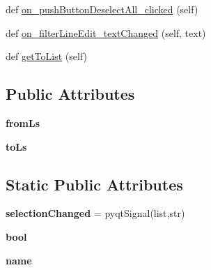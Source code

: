 \begin{DoxyCompactItemize}
\item 
def \mbox{\hyperlink{class_dsg_tools_1_1_custom_widgets_1_1custom_selector_1_1_custom_selector_accf01df90f08ef45db4669da7d15c205}{on\+\_\+push\+Button\+Deselect\+All\+\_\+clicked}} (self)
\item 
def \mbox{\hyperlink{class_dsg_tools_1_1_custom_widgets_1_1custom_selector_1_1_custom_selector_ac2e49650f5a2fe07de9093342a84f199}{on\+\_\+filter\+Line\+Edit\+\_\+text\+Changed}} (self, text)
\item 
def \mbox{\hyperlink{class_dsg_tools_1_1_custom_widgets_1_1custom_selector_1_1_custom_selector_a934d51c4b3f8667e23ddaeac8da90970}{get\+To\+List}} (self)
\end{DoxyCompactItemize}
\subsection*{Public Attributes}
\begin{DoxyCompactItemize}
\item 
\mbox{\label{class_dsg_tools_1_1_custom_widgets_1_1custom_selector_1_1_custom_selector_acae5fed8e46bdc34b469f2673d46b4bf}} 
{\bfseries from\+Ls}
\item 
\mbox{\label{class_dsg_tools_1_1_custom_widgets_1_1custom_selector_1_1_custom_selector_ada833c8cb81a9682d2671b5de32ac110}} 
{\bfseries to\+Ls}
\end{DoxyCompactItemize}
\subsection*{Static Public Attributes}
\begin{DoxyCompactItemize}
\item 
\mbox{\label{class_dsg_tools_1_1_custom_widgets_1_1custom_selector_1_1_custom_selector_af9e454c99130e13f584a6ed3575db948}} 
{\bfseries selection\+Changed} = pyqt\+Signal(list,str)
\item 
\mbox{\label{class_dsg_tools_1_1_custom_widgets_1_1custom_selector_1_1_custom_selector_a45b375031f41c49f3af7cafbe3302db8}} 
{\bfseries bool}
\item 
\mbox{\label{class_dsg_tools_1_1_custom_widgets_1_1custom_selector_1_1_custom_selector_a175117e2fbc25c2a2a9e3311b3bffff1}} 
{\bfseries name}
\end{DoxyCompactItemize}


